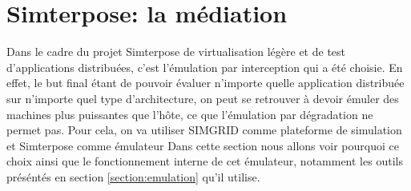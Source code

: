 \section{Simterpose: la médiation}
\label{section:simterpose}

Dans le cadre du projet Simterpose de virtualisation légère et de test
d'applications distribuées, c'est l'émulation par interception qui a été
choisie. En effet, le but final étant de pouvoir évaluer n'importe quelle
application distribuée sur n'importe quel type d'architecture, on peut se
retrouver à devoir émuler des machines plus puissantes que l'hôte, ce que
l'émulation par dégradation ne permet pas. Pour cela, on va utiliser SIMGRID
comme plateforme de simulation et Simterpose comme émulateur Dans cette section
nous allons voir pourquoi ce choix ainsi que le fonctionnement interne de cet
émulateur, notamment les outils préséntés en section \ref{section:emulation}
qu'il utilise.

